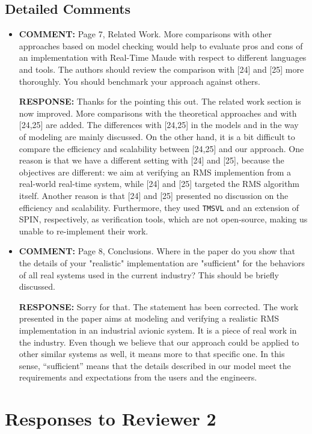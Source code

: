 \documentclass[10pt,journal]{IEEEtran}
\newcommand{\ANSWER}{{\bf RESPONSE: }}
\newcommand{\COMMENT}{{\bf COMMENT: }}
\begin{document}
\subsection{Detailed Comments}
\begin{itemize}
\item
\COMMENT Page 7, Related Work. More comparisons with other approaches
based on model checking would help to evaluate pros and cons of an
implementation with Real-Time Maude with respect to different
languages and tools. The authors should review the comparison with
[24] and [25] more thoroughly. You should benchmark your approach
against others.

\ANSWER Thanks for the pointing this out. The related work section is
now improved. More comparisons with the theoretical approaches and
with [24,25] are added. The differences with [24,25] in the models and
in the way of modeling are mainly discussed. On the other hand, it is
a bit difficult to compare the efficiency and scalability between
[24,25] and our approach. One reason is that we have a different
setting with [24] and [25], because the objectives are different: we
aim at verifying an RMS implemention from a real-world real-time
system, while [24] and [25] targeted the RMS algorithm itself. Another
reason is that [24] and [25] presented no discussion on the efficiency
and scalability. Furthermore, they used \verb|TMSVL| and an extension
of SPIN, respectively, as verification tools, which are not
open-source, making us unable to re-implement their work.

\item
\COMMENT Page 8, Conclusions. Where in the paper do you show that the
details of your "realistic" implementation are "sufficient" for the
behaviors of all real systems used in the current industry? This
should be briefly discussed.

\ANSWER Sorry for that. The statement has been corrected. The work
presented in the paper aims at modeling and verifying a realistic RMS
implementation in an industrial avionic system. It is a piece of real
work in the industry. Even though we believe that our approach could
be applied to other similar systems as well, it means more to that
specific one. In this sense, ``sufficient'' means that the details
described in our model meet the requirements and expectations from the
users and the engineers.

\end{itemize}

\section{Responses to Reviewer 2}
\end{document}
